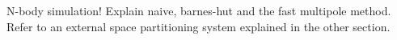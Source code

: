 \documentclass[../main.tex]{subfiles}
\begin{document}
N-body simulation! Explain naive, barnes-hut and the fast multipole method. Refer to an external space partitioning system explained in the other section.
\end{document}
